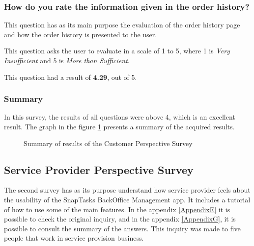 \subsubsection{How do you rate the information given in the order history?}

This question has as its main purpose the evaluation of the order history page and how the order history is presented to the user. 
\par
This question asks the user to evaluate in a scale of 1 to 5, where 1 is \textit{Very Insufficient} and 5 is \textit{More than Sufficient}. 
\par
This question had a result of \textbf{4.29}, out of 5. 

\subsubsection{Summary}
In this survey, the results of all questions were above 4, which is an excellent result. The graph in the figure \ref{fig:CustomerSurveyResults} presents a summary of the acquired results.


\begin{figure}[ht]
\centering
\caption{Summary of results of the Customer Perspective Survey}
\label{fig:CustomerSurveyResults}
\end{figure}


\subsection{Service Provider Perspective Survey}
The second survey has as its purpose understand how service provider feels about the usability of the SnapTasks BackOffice Management app. It includes a tutorial of how to use some of the  main features. In the appendix \ref{AppendixE} it is possible to check the original inquiry, and in the appendix \ref{AppendixG}, it is possible to consult the summary of the answers. This inquiry was made to five people that work in service provision business.

